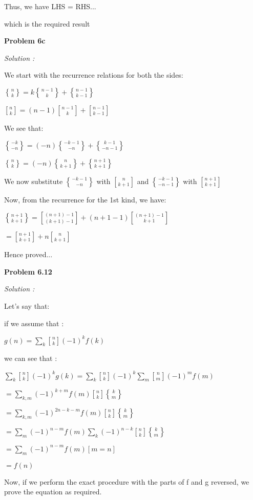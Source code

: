 \documentclass[12pt]{article}
\begin{document}
Thus, we have LHS = RHS...

which is the required result

\medskip

\medskip

\noindent
{\bf Problem 6c}

\textit {Solution :}

We start with the recurrence relations for both the sides:

${n \brace k} = {k{n-1 \brace k}} + {n-1 \brace k-1}$

${n \brack k} = {(n-1){n-1 \brack k}} + {n-1 \brack k-1}$

We see that:

${-k \brace -n} = {(-n){-k-1 \brace -n}} + {k-1 \brace -n-1}$

${n \brace k} = {(-n){n \brace k+1}} + {n+1 \brace k+1}$

We now substitute ${-k-1 \brace -n}$ with $n \brack k+1$ and ${-k-1 \brace -n-1}$ with $n+1 \brack k+1$

Now, from the recurrence for the 1st kind, we have:

${n+1 \brace k+1} = {(n+1) - 1 \brack (k+1)-1}+{(n+1-1){(n+1)-1 \brack k+1}}$

$= {n+1 \brack k+1}+{n{n \brack k+1}}$

Hence proved...

\medskip

\medskip

\noindent
{\bf Problem 6.12}

\textit {Solution :}

Let's say that:

if we assume that :

$g(n) = \sum_k{{n \brack k}(-1)^kf(k)}$

we can see that : 

$\sum_k{{n \brack k}(-1)^kg(k)} = \sum_k{n \brack k}(-1)^k{\sum_m{{n \brack m}}(-1)^mf(m)}$

$= \sum_{k,m}{(-1)^{k+m}f(m){n \brack k}{k \brace m}}$

$= \sum_{k,m}{(-1)^{2n-k-m}f(m){n \brack k}{k \brace m}}$

$= \sum_{m}{(-1)^{n-m}f(m)\sum_{k}{(-1)^{n-k}}{n \brack k}{k \brace m}}$

$ = \sum_{m} {(-1)^{n-m}f(m)[m=n]}$

$= f(n)$

Now, if we perform the exact procedure with the parts of f and g reversed, we prove the equation as required.
\end{document}
